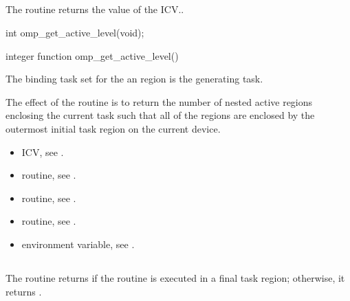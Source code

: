 \subsection{}
\label{subsec:omp_get_active_level}
\summary
The  routine returns the value of 
the  ICV..

\format
\begin{ccppspecific}
\begin{ompcFunction}
int omp_get_active_level(void);
\end{ompcFunction}
\end{ccppspecific}

\begin{fortranspecific}
\begin{ompfFunction}
integer function omp_get_active_level()
\end{ompfFunction}
\end{fortranspecific}

\binding
The binding task set for the an  region 
is the generating task.

\effect
The effect of the  routine is to return 
the number of nested active  regions enclosing the 
current task such that all of the  regions are 
enclosed by the outermost initial task region on the current device.

\crossreferences
\begin{itemize}
\item {} ICV, see
.

\item {} routine, see
.

\item {} routine, see
.

\item {} routine, see
.

\item {} environment variable, see
.
\end{itemize}



\subsection{}
\label{subsec:omp_in_final}
\summary
The  routine returns  if the routine 
is executed in a final task region; otherwise, it returns .

